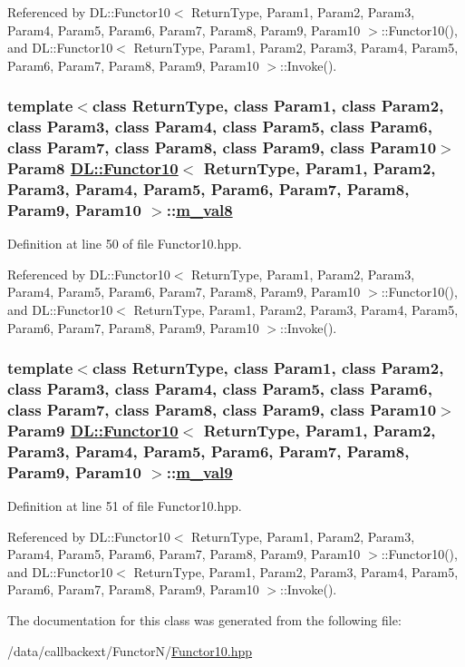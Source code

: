 Referenced by DL::Functor10$<$ Return\-Type, Param1, Param2, Param3, Param4, Param5, Param6, Param7, Param8, Param9, Param10 $>$::Functor10(), and DL::Functor10$<$ Return\-Type, Param1, Param2, Param3, Param4, Param5, Param6, Param7, Param8, Param9, Param10 $>$::Invoke().\hypertarget{classDL_1_1Functor10_r8}{
\subsubsection[m\_\-val8]{\setlength{\rightskip}{0pt plus 5cm}template$<$class Return\-Type, class Param1, class Param2, class Param3, class Param4, class Param5, class Param6, class Param7, class Param8, class Param9, class Param10$>$ Param8 \hyperlink{classDL_1_1Functor10}{DL::Functor10}$<$ Return\-Type, Param1, Param2, Param3, Param4, Param5, Param6, Param7, Param8, Param9, Param10 $>$::\hyperlink{classDL_1_1Functor10_r8}{m\_\-val8}}}
\label{classDL_1_1Functor10_r8}




Definition at line 50 of file Functor10.hpp.

Referenced by DL::Functor10$<$ Return\-Type, Param1, Param2, Param3, Param4, Param5, Param6, Param7, Param8, Param9, Param10 $>$::Functor10(), and DL::Functor10$<$ Return\-Type, Param1, Param2, Param3, Param4, Param5, Param6, Param7, Param8, Param9, Param10 $>$::Invoke().\hypertarget{classDL_1_1Functor10_r9}{
\subsubsection[m\_\-val9]{\setlength{\rightskip}{0pt plus 5cm}template$<$class Return\-Type, class Param1, class Param2, class Param3, class Param4, class Param5, class Param6, class Param7, class Param8, class Param9, class Param10$>$ Param9 \hyperlink{classDL_1_1Functor10}{DL::Functor10}$<$ Return\-Type, Param1, Param2, Param3, Param4, Param5, Param6, Param7, Param8, Param9, Param10 $>$::\hyperlink{classDL_1_1Functor10_r9}{m\_\-val9}}}
\label{classDL_1_1Functor10_r9}




Definition at line 51 of file Functor10.hpp.

Referenced by DL::Functor10$<$ Return\-Type, Param1, Param2, Param3, Param4, Param5, Param6, Param7, Param8, Param9, Param10 $>$::Functor10(), and DL::Functor10$<$ Return\-Type, Param1, Param2, Param3, Param4, Param5, Param6, Param7, Param8, Param9, Param10 $>$::Invoke().

The documentation for this class was generated from the following file:\begin{CompactItemize}
\item 
/data/callbackext/Functor\-N/\hyperlink{Functor10_8hpp}{Functor10.hpp}\end{CompactItemize}
